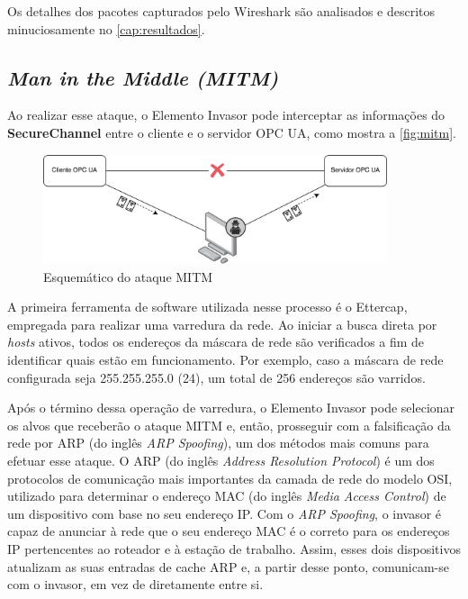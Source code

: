         Os detalhes dos pacotes capturados pelo Wireshark são analisados e descritos minuciosamente no \autoref{cap:resultados}.
    
    \subsection{\textit{Man in the Middle (MITM)}}

        Ao realizar esse ataque, o Elemento Invasor pode interceptar as informações do \textbf{SecureChannel} entre o cliente e o servidor OPC UA, como mostra a \autoref{fig:mitm}.

        \begin{figure}[htbp]
            \caption{\label{fig:mitm}Esquemático do ataque MITM}
            \begin{center}
                \includegraphics[width=0.9\textwidth]{USPSC-img/mitm.png}
            \end{center}
        \end{figure}
        
        A primeira ferramenta de software utilizada nesse processo é o Ettercap, empregada para realizar uma varredura da rede. Ao iniciar a busca direta por \textit{hosts} ativos, todos os endereços da máscara de rede são verificados a fim de identificar quais estão em funcionamento. Por exemplo, caso a máscara de rede configurada seja 255.255.255.0 (24), um total de 256 endereços são varridos.
        
        Após o término dessa operação de varredura, o Elemento Invasor pode selecionar os alvos que receberão o ataque MITM e, então, prosseguir com a falsificação da rede por ARP (do inglês \textit{ARP Spoofing}), um dos métodos mais comuns para efetuar esse ataque. O ARP (do inglês \textit{Address Resolution Protocol}) é um dos protocolos de comunicação mais importantes da camada de rede do modelo OSI, utilizado para determinar o endereço MAC (do inglês \textit{Media Access Control}) de um dispositivo com base no seu endereço IP. Com o \textit{ARP Spoofing}, o invasor é capaz de anunciar à rede que o seu endereço MAC é o correto para os endereços IP pertencentes ao roteador e à estação de trabalho. Assim, esses dois dispositivos atualizam as suas entradas de cache ARP e, a partir desse ponto, comunicam-se com o invasor, em vez de diretamente entre si.

